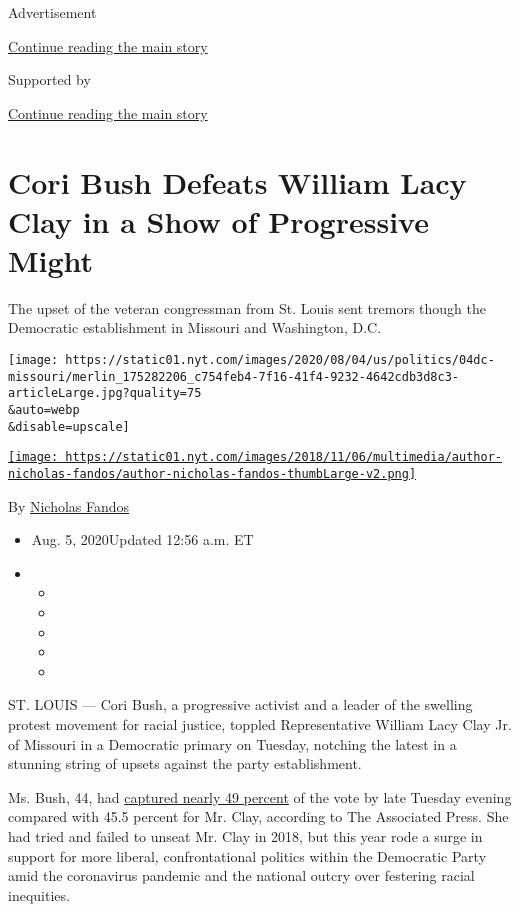 Advertisement

\protect\hyperlink{after-top}{Continue reading the main story}

Supported by

\protect\hyperlink{after-sponsor}{Continue reading the main story}

\hypertarget{cori-bush-defeats-william-lacy-clay-in-a-show-of-progressive-might}{%
\section{Cori Bush Defeats William Lacy Clay in a Show of Progressive
Might}\label{cori-bush-defeats-william-lacy-clay-in-a-show-of-progressive-might}}

The upset of the veteran congressman from St. Louis sent tremors though
the Democratic establishment in Missouri and Washington, D.C.

\texttt{[image: https://static01.nyt.com/images/2020/08/04/us/politics/04dc-missouri/merlin\_175282206\_c754feb4-7f16-41f4-9232-4642cdb3d8c3-articleLarge.jpg?quality=75\\\&auto=webp\\\&disable=upscale]}

\href{https://www.nytimes.com/by/nicholas-fandos}{\texttt{[image: https://static01.nyt.com/images/2018/11/06/multimedia/author-nicholas-fandos/author-nicholas-fandos-thumbLarge-v2.png]}}

By \href{https://www.nytimes.com/by/nicholas-fandos}{Nicholas Fandos}

\begin{itemize}
\item
  Aug. 5, 2020Updated 12:56 a.m. ET
\item
  \begin{itemize}
  \item
  \item
  \item
  \item
  \item
  \end{itemize}
\end{itemize}

ST. LOUIS --- Cori Bush, a progressive activist and a leader of the
swelling protest movement for racial justice, toppled Representative
William Lacy Clay Jr. of Missouri in a Democratic primary on Tuesday,
notching the latest in a stunning string of upsets against the party
establishment.

Ms. Bush, 44, had
\href{https://www.nytimes.com/interactive/2020/08/04/us/elections/results-missouri-house-district-1-primary-election.html}{captured
nearly 49 percent} of the vote by late Tuesday evening compared with
45.5 percent for Mr. Clay, according to The Associated Press. She had
tried and failed to unseat Mr. Clay in 2018, but this year rode a surge
in support for more liberal, confrontational politics within the
Democratic Party amid the coronavirus pandemic and the national outcry
over festering racial inequities.

